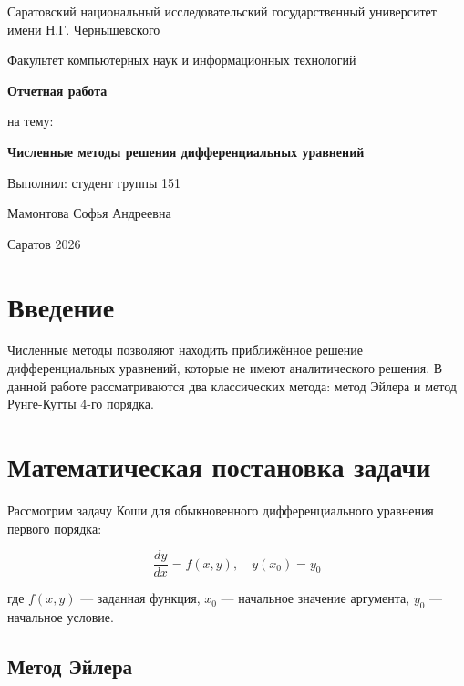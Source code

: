 \documentclass{SCWorks}
\begin{document}
	
	\begin{titlepage}
		\centering
		\vspace*{2cm}
		{\Large Саратовский национальный исследовательский государственный университет имени Н.Г. Чернышевского \par}
		\vspace{1cm}
		{\Large Факультет компьютерных наук и информационных технологий \par}
		\vspace{3cm}
		{\Huge \bfseries Отчетная работа \par}
		\vspace{0.5cm}
		{\Large на тему: \par}
		{\Large \bfseries Численные методы решения дифференциальных уравнений \par}
		\vspace{3cm}
		{\Large Выполнил: студент группы 151 \par}
		{\Large Мамонтова Софья Андреевна \par}
		\vfill
		{\large Саратов 2026 \par}
	\end{titlepage}
	
	\tableofcontents
	\newpage
	
	\section{Введение}
	
	Численные методы позволяют находить приближённое решение дифференциальных уравнений, которые не имеют аналитического решения. В данной работе рассматриваются два классических метода: метод Эйлера и метод Рунге-Кутты 4-го порядка.
	
	\section{Математическая постановка задачи}
	
	Рассмотрим задачу Коши для обыкновенного дифференциального уравнения первого порядка:
	
	\begin{equation}
		\frac{dy}{dx} = f(x, y), \quad y(x_0) = y_0
		\label{eq:cauchy}
	\end{equation}
	
	где \( f(x, y) \) — заданная функция, \( x_0 \) — начальное значение аргумента, \( y_0 \) — начальное условие.
	
	\subsection{Метод Эйлера}
	
\end{document}
